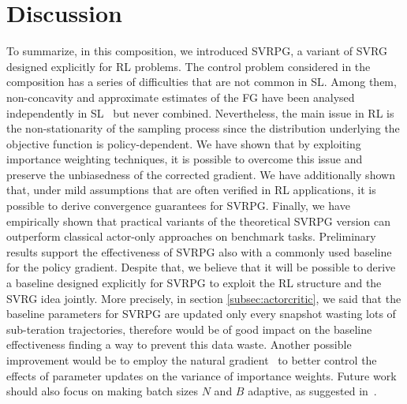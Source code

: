 \section{Discussion}
\vspace{-0.05in}
To summarize, in this composition, we introduced \acs{SVRPG}, a variant of \acs{SVRG} designed explicitly for \acs{RL} problems.
The control problem considered in the composition has a series of difficulties that are not common in \acs{SL}.
Among them, non-concavity and approximate estimates of the \acs{FG} have been analysed independently in \acs{SL}~\citep[\eg][]{allen2016variance,reddi2016stochastic,harikandeh2015stopwasting} but never combined.
Nevertheless, the main issue in \acs{RL} is the non-stationarity of the sampling process since the distribution underlying the objective function is policy-dependent.
We have shown that by exploiting importance weighting techniques, it is possible to overcome this issue and preserve the unbiasedness of the corrected gradient.
We have additionally shown that, under mild assumptions that are often verified in \acs{RL} applications, it is possible to derive convergence guarantees for \acs{SVRPG}.
Finally, we have empirically shown that practical variants of the theoretical \acs{SVRPG} version can outperform classical actor-only approaches on benchmark tasks.
Preliminary results support the effectiveness of \acs{SVRPG} also with a commonly used baseline for the policy gradient.
Despite that, we believe that it will be possible to derive a baseline designed explicitly for \acs{SVRPG} to exploit the \acs{RL} structure and the \acs{SVRG} idea jointly. More precisely, in section \ref{subsec:actorcritic}, we said that the baseline parameters for \acs{SVRPG} are updated only every snapshot wasting lots of sub-teration trajectories, therefore would be of good impact on the baseline effectiveness finding a way to prevent this data waste.
Another possible improvement would be to employ the natural gradient~\cite{kakade2002natural} to better control the effects of parameter updates on the variance of importance weights. Future work should also focus on making batch sizes $N$ and $B$ adaptive, as suggested in~\cite{papini2017adaptive}.
\vspace{-0.05in}